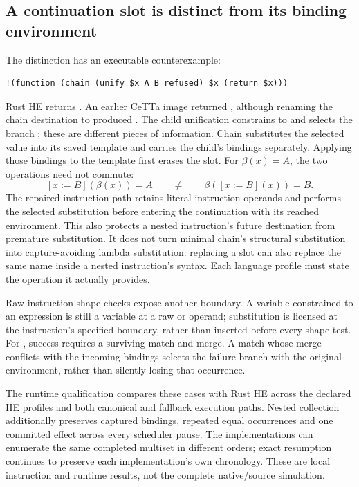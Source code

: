 \documentclass[11pt,a4paper]{article}
\newcommand{\code}[1]{\texttt{\detokenize{#1}}}
\begin{document}
\subsection*{A continuation slot is distinct from its binding environment}

The distinction has an executable counterexample:
\begin{verbatim}
!(function (chain (unify $x A B refused) $x (return $x)))
\end{verbatim}
Rust HE returns \code{B}. An earlier CeTTa image returned \code{A}, although
renaming the chain destination to \code{$y} produced \code{B}. The child
unification constrains \code{$x} to \code{A} and selects the branch
\code{B}; these are different pieces of information. Chain substitutes the
selected value into its saved template and carries the child's bindings
separately. Applying those bindings to the template first erases the slot.
For $\beta(x)=A$, the two operations need not commute:
\[
  [x:=B](\beta(x))=A \qquad\ne\qquad
  \beta([x:=B](x))=B.
\]
The repaired instruction path retains literal instruction operands and
performs the selected substitution before entering the continuation with
its reached environment. This also protects a nested instruction's future
destination from premature substitution. It does not turn minimal chain's
structural substitution into capture-avoiding lambda substitution: replacing
a slot can also replace the same name inside a nested instruction's syntax.
Each language profile must state the operation it actually provides.

Raw instruction shape checks expose another boundary. A variable constrained
to an expression is still a variable at a raw \code{cons-atom} or
\code{decons-atom} operand; substitution is licensed at the instruction's
specified boundary, rather than inserted before every shape test. For
\code{unify}, success requires a surviving match and merge. A match whose
merge conflicts with the incoming bindings selects the failure branch with
the original environment, rather than silently losing that occurrence.

The runtime qualification compares these cases with Rust HE across the
declared HE profiles and both canonical and fallback execution paths. Nested collection
additionally preserves captured bindings, repeated equal occurrences and
one committed effect across every scheduler pause. The implementations can
enumerate the same completed multiset in different orders; exact resumption
continues to preserve each implementation's own chronology. These are local
instruction and runtime results, not the complete native/source simulation.
\end{document}
